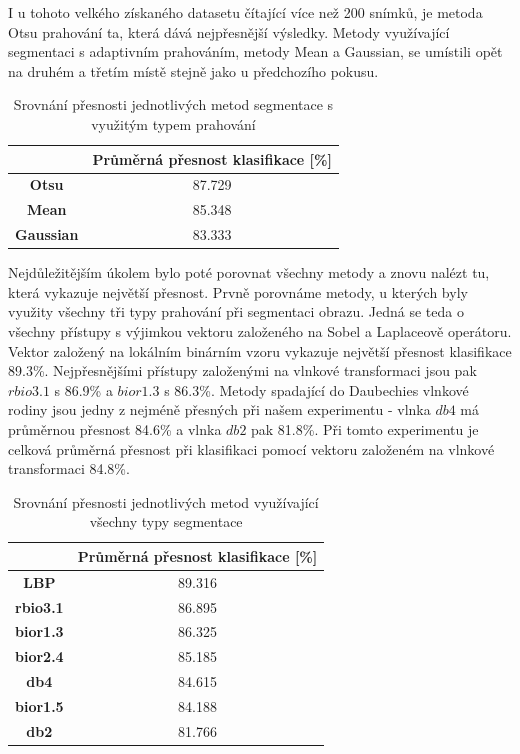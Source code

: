 I u tohoto velkého získaného datasetu čítající více než 200 snímků, je metoda Otsu prahování ta, která dává nejpřesnější výsledky. Metody využívající segmentaci s adaptivním prahováním, metody Mean a Gaussian, se umístili opět na druhém a třetím místě stejně jako u předchozího pokusu.

\capstartfalse
\begin{table}[!htbp]
\centering
\begin{tabular}{|c|c|}
\hline
                  & \textbf{Průměrná přesnost klasifikace {[}\%{]}} \\ \hline
\textbf{Otsu}     & 87.729                                         \\ \hline
\textbf{Mean}     & 85.348                                         \\ \hline
\textbf{Gaussian} & 83.333                                         \\ \hline
\end{tabular}
\caption{Srovnání přesnosti jednotlivých metod segmentace s využitým typem prahování}
\end{table}
\capstarttrue

Nejdůležitějším úkolem bylo poté porovnat všechny metody a znovu nalézt tu, která vykazuje největší přesnost. Prvně porovnáme metody, u kterých byly využity všechny tři typy prahování při segmentaci obrazu. Jedná se teda o všechny přístupy s výjimkou vektoru založeného na Sobel a Laplaceově operátoru. Vektor založený na lokálním binárním vzoru vykazuje největší přesnost klasifikace 89.3\%. Nejpřesnějšími přístupy založenými na vlnkové transformaci jsou pak $rbio3.1$ s 86.9\% a $bior1.3$ s 86.3\%. Metody spadající do Daubechies vlnkové rodiny jsou jedny z nejméně přesných při našem experimentu - vlnka $db4$ má průměrnou přesnost 84.6\% a vlnka $db2$ pak 81.8\%. Při tomto experimentu je celková průměrná přesnost při klasifikaci pomocí vektoru založeném na vlnkové transformaci 84.8\%.

\capstartfalse
\begin{table}[!htbp]
\centering
\begin{tabular}{|c|c|}
\hline
                 & \textbf{Průměrná přesnost klasifikace {[}\%{]}} \\ \hline
\textbf{LBP}     & 89.316                                         \\ \hline
\textbf{rbio3.1} & 86.895                                         \\ \hline
\textbf{bior1.3} & 86.325                                         \\ \hline
\textbf{bior2.4} & 85.185                                         \\ \hline
\textbf{db4}     & 84.615                                         \\ \hline
\textbf{bior1.5} & 84.188                                         \\ \hline
\textbf{db2}     & 81.766                                         \\ \hline
\end{tabular}
\caption{Srovnání přesnosti jednotlivých metod využívající všechny typy segmentace}
\end{table}
\capstarttrue

